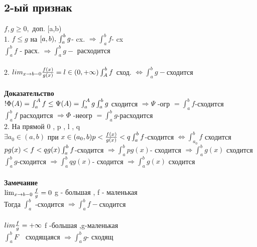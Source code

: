 \documentclass[12pt, a4paper]{article}
\begin{document}
       \subsection{2-ый признак}
     $  f, g \geq 0 ,$ доп. [a,b) \\
     1. $f \leq g$ на $ [a,b),\\
      \int_a^b g $- cx. $ \Rightarrow \int_a^b f $- cx \\ 
      $\int_a^b f$ - расх. $ \Rightarrow \int_a^b g -$ расходится  \\
      \\
      2. $lim_{x \rightarrow b - 0} \frac{f(x)}{g(x)} = l \in (0 , +\infty) \\
      \int_A^b f$ сход. $ \Leftrightarrow \int_a^b g - $сходится \\
      \\
      \textbf{Доказательство}\\
      $ ! \Phi(A) = \int_a^A f \leq \Psi(A) = \int_a^A g \\
      \int_a^b g $ сходится $ \Rightarrow \Psi $ -огр $ = \int_a^b f $-сходится \\
      $\int_a^b f $ расходится $ \Rightarrow \Phi $ -неогр $ = \int_a^b g $-расходится \\
      2. На прямой 0 , p , l , q \\
      $ \exists  a_0 \in (a,b) $ при $  x \in (a_0,b) p < \frac{f(x)}{g(x)} < q \\
      \int_a^b f $-сходится $ \Leftrightarrow \int_{a_0}^b f $ сходится \\
     $ p g(x) < f < q g(x) \\
     \int_a^b f $-сходится  $ \Rightarrow \int_a^b p g(x) $- сходится $ \Rightarrow \int _a^b g(x) $ сходится \\
     $  \int_a^b g$-сходится  $ \Rightarrow \int_a^b q g(x) $- сходится $ \Rightarrow \int _a^b g(x) $ сходится \\
     \\
     \textbf{Замечание}\\
     $ \lim_{x \rightarrow b - 0} \frac{f}{g} = 0 \\$
     g - большая ,  f - маленькая \\
    Тогда $ \int_a^b$ -сходится $ \Rightarrow \int_a^b f- $сходится \\
   \\
   $lim \frac{f}{g} = +\infty \\$
   f -большая ,g-маленькая \\
   $ \int_a^b F $  сходящаяся $ \Rightarrow \int_a^b g $- сходящ\\   
   
\end{document}

